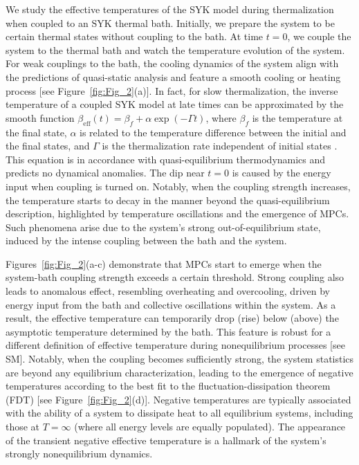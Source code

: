 \documentclass[prl,superscriptaddress,notitlepage,showpacs,twocolumn]{revtex4-2}
\begin{document}
We study the effective temperatures of the SYK model during thermalization when coupled to an SYK thermal bath. Initially, we prepare the system to be certain thermal states without coupling to the bath. At time $t=0$, we couple the system to the thermal bath and watch the temperature evolution of the system. For weak couplings to the bath, the cooling dynamics of the system align with the predictions of quasi-static analysis and feature a smooth cooling or heating process [see Figure~\ref{fig:Fig_2}(a)]. In fact, for slow thermalization, the inverse temperature of a coupled SYK model at late times can be approximated by the smooth function $\beta_{\mathrm{eff}}(t)=\beta_f +\alpha \exp (-\Gamma t)$, where $\beta_f$ is the temperature at the final state, $\alpha$ is related to the temperature difference between the initial and the final states, and $\Gamma$ is the thermalization rate independent of initial states \cite{eberlein2017quantum}. This equation is in accordance with quasi-equilibrium thermodynamics and predicts no dynamical anomalies. The dip near $t=0$ is caused by the energy input when coupling is turned on. Notably, when the coupling strength increases, the temperature starts to decay in the manner beyond the quasi-equilibrium description, highlighted by temperature oscillations and the emergence of MPCs. Such phenomena arise due to the system's strong out-of-equilibrium state, induced by the intense coupling between the bath and the system. 

Figures~\ref{fig:Fig_2}(a-c) demonstrate that MPCs start to emerge when the system-bath coupling strength exceeds a certain threshold. Strong coupling also leads to anomalous effect, resembling overheating and overcooling, driven by energy input from the bath and collective oscillations within the system. As a result, the effective temperature can temporarily drop (rise) below (above) the asymptotic temperature determined by the bath. This feature is robust for a different definition of effective temperature during nonequilibrium processes [see SM]. Notably, when the coupling becomes sufficiently strong, the system statistics are beyond any equilibrium characterization, leading to the emergence of negative temperatures according to the best fit to the fluctuation-dissipation theorem (FDT) [see Figure~\ref{fig:Fig_2}(d)]. Negative temperatures are typically associated with the ability of a system to dissipate heat to all equilibrium systems, including those at $T=\infty$ (where all energy levels are equally populated). The appearance of the transient negative effective temperature is a hallmark of the system's strongly nonequilibrium dynamics. 
\end{document}

